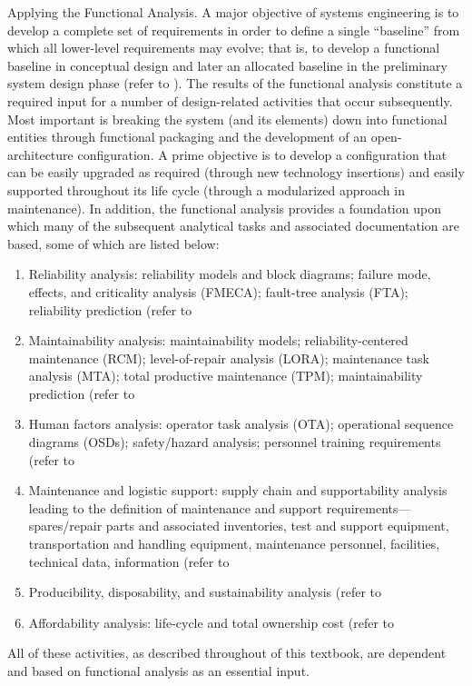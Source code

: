 Applying the Functional Analysis. A major objective of systems engineering is to develop a complete set of requirements in order to define a single ``baseline'' from which all lower-level requirements may evolve; that is, to develop a functional baseline in conceptual design and later an allocated baseline in the preliminary system design phase (refer to ). The results of the functional analysis constitute a required input for a number of design-related activities that occur subsequently. Most important is breaking the system (and its elements) down into functional entities through functional packaging and the development of an open-architecture configuration. A prime objective is to develop a configuration that can be easily upgraded as required (through new technology insertions) and easily supported throughout its life cycle (through a modularized approach in maintenance). In addition, the functional analysis provides a foundation upon which many of the subsequent analytical tasks and associated documentation are based, some of which are listed below:

\begin{enumerate}
\item Reliability analysis: reliability models and block diagrams; failure mode, effects, and criticality analysis (FMECA); fault-tree analysis (FTA); reliability prediction (refer to 
\item Maintainability analysis: maintainability models; reliability-centered maintenance (RCM); level-of-repair analysis (LORA); maintenance task analysis (MTA); total productive maintenance (TPM); maintainability prediction (refer to 
\item Human factors analysis: operator task analysis (OTA); operational sequence diagrams (OSDs); safety/hazard analysis; personnel training requirements (refer to 
\item Maintenance and logistic support: supply chain and supportability analysis leading to the definition of maintenance and support requirements—spares/repair parts and associated inventories, test and support equipment, transportation and handling equipment, maintenance personnel, facilities, technical data, information (refer to 
\item Producibility, disposability, and sustainability analysis (refer to 
\item Affordability analysis: life-cycle and total ownership cost (refer to 
\end{enumerate}

All of these activities, as described throughout of this textbook, are dependent and based on functional analysis as an essential input.


